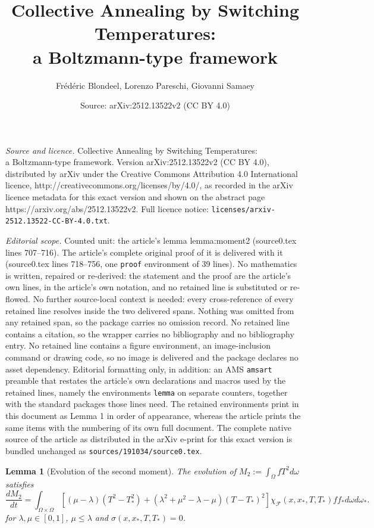 \documentclass[10pt,a4paper]{amsart}
\title{Collective Annealing by Switching Temperatures:\\ a Boltzmann-type framework}
\author{Fr\'ed\'eric Blondeel, Lorenzo Pareschi, Giovanni Samaey}
\date{Source: arXiv:2512.13522v2 (CC BY 4.0)}
\newtheorem{lemma}{Lemma}
\begin{document}
\maketitle

\noindent\emph{Source and licence.} Collective Annealing by Switching Temperatures:\\ a Boltzmann-type framework. Version arXiv:2512.13522v2 (CC BY 4.0), distributed by arXiv under the Creative Commons Attribution 4.0 International licence, http://creativecommons.org/licenses/by/4.0/, as recorded in the arXiv licence metadata for this exact version and shown on the abstract page https://arxiv.org/abs/2512.13522v2. Full licence notice: \texttt{licenses/arxiv-2512.13522-CC-BY-4.0.txt}.\par\smallskip

\noindent\textit{Editorial scope.} Counted unit: the article's lemma lemma:moment2 (source0.tex lines 707--716). The article's complete original proof of it is delivered with it (source0.tex lines 718--756, one \texttt{proof} environment of 39 lines). No mathematics is written, repaired or re-derived: the statement and the proof are the article's own lines, in the article's own notation, and no retained line is substituted or re-flowed.  No further source-local context is needed: every cross-reference of every retained line resolves inside the two delivered spans.  Nothing was omitted from any retained span, so the package carries no omission record.  No retained line contains a citation, so the wrapper carries no bibliography and no bibliography entry.  No retained line contains a figure environment, an image-inclusion command or drawing code, so no image is delivered and the package declares no asset dependency.  Editorial formatting only, in addition: an AMS \texttt{amsart} preamble that restates the article's own declarations and macros used by the retained lines, namely the environments \texttt{lemma} on separate counters, together with the standard packages those lines need.  The retained environments print in this document as Lemma 1 in order of appearance, whereas the article prints the same items with the numbering of its own full document.  The complete native source of the article as distributed in the arXiv e-print for this exact version is bundled unchanged as \texttt{sources/191034/source0.tex}.
\begin{lemma}[Evolution of the second moment]
\label{lemma:moment2}
The evolution of $
M_2:=\int_{\Omega}fT^2d\omega$
satisfies
 \begin{equation*}
\frac{dM_2}{dt}=\int_{\Omega\times\Omega}\left[(\mu-\lambda)(T^2-T_*^2)+(\lambda^2+\mu^2-\lambda-\mu)(T-T_*)^2\right]\chi_\mathcal{F}(x,x_*,T,T_*)ff_*d\omega d\omega_*.
\end{equation*}
for $\lambda,\mu\in [0,1]$, $\mu\leq\lambda$ and $\sigma(x,x_*,T,T_*)=0$. 
\end{lemma}
\end{document}

